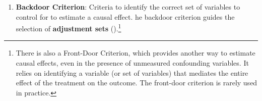 \documentclass[
  singlecolumn,
  9pt]{article}
\providecommand{\tightlist}{%
  \setlength{\itemsep}{0pt}\setlength{\parskip}{0pt}}\usepackage{longtable,booktabs,array}
\begin{document}
\begin{enumerate}
\def\labelenumi{\arabic{enumi}.}
\setcounter{enumi}{11}
\tightlist
\item
  \textbf{Backdoor Criterion}: Criteria to identify the correct set of
  variables to control for to estimate a causal effect. he backdoor
  criterion guides the selection of \textbf{adjustment sets}
  ().\footnote{There is also a
    Front-Door Criterion, which provides another way to estimate causal
    effects, even in the presence of unmeasured confounding variables.
    It relies on identifying a variable (or set of variables) that
    mediates the entire effect of the treatment on the outcome. The
    front-door criterion is rarely used in practice.}
\end{enumerate}
\end{document}
